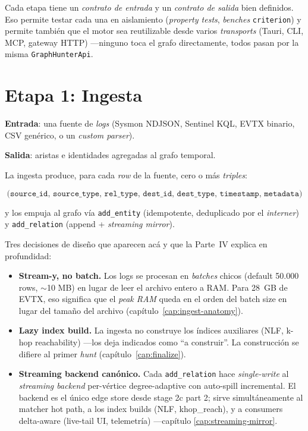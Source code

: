 Cada etapa tiene un \emph{contrato de entrada} y un \emph{contrato
de salida} bien definidos. Eso permite testar cada una en aislamiento
(\emph{property tests}, \emph{benches} \texttt{criterion}) y permite
también que el motor sea reutilizable desde varios \emph{transports}
(Tauri, CLI, MCP, gateway HTTP) ---ninguno toca el grafo
directamente, todos pasan por la misma \texttt{GraphHunterApi}.

\section{Etapa 1: Ingesta}

\textbf{Entrada}: una fuente de \emph{logs} (Sysmon NDJSON, Sentinel
KQL, EVTX binario, CSV genérico, o un \emph{custom parser}).

\textbf{Salida}: aristas e identidades agregadas al grafo temporal.

La ingesta produce, para cada \emph{row} de la fuente, cero o más
\emph{triples}:

\[
\texttt{(source\_id, source\_type, rel\_type, dest\_id, dest\_type, timestamp, metadata)}
\]

\noindent
y los empuja al grafo vía \texttt{add\_entity} (idempotente,
deduplicado por el \emph{interner}) y \texttt{add\_relation}
(append + \emph{streaming mirror}).

Tres decisiones de diseño que aparecen acá y que la Parte~IV explica
en profundidad:

\begin{itemize}
    \item \textbf{Stream-y, no batch.} Los logs se procesan en
    \emph{batches} chicos (default 50.000 rows, $\sim$10 MB) en
    lugar de leer el archivo entero a RAM. Para 28~GB de EVTX, eso
    significa que el \emph{peak RAM} queda en el orden del batch
    size en lugar del tamaño del archivo
    (capítulo~\ref{cap:ingest-anatomy}).
    \item \textbf{Lazy index build.} La ingesta no construye los
    índices auxiliares (NLF, k-hop reachability) ---los deja
    indicados como ``a construir''. La construcción se difiere al
    primer \emph{hunt} (capítulo~\ref{cap:finalize}).
    \item \textbf{Streaming backend canónico.} Cada
    \texttt{add\_relation} hace \emph{single-write} al
    \emph{streaming backend} per-vértice degree-adaptive con
    auto-spill incremental. El backend es el único edge store
    desde stage 2c part 2; sirve simultáneamente al matcher hot
    path, a los index builds (NLF, khop\_reach), y a consumers
    delta-aware (live-tail UI, telemetría) ---capítulo
    \ref{cap:streaming-mirror}.
\end{itemize}


